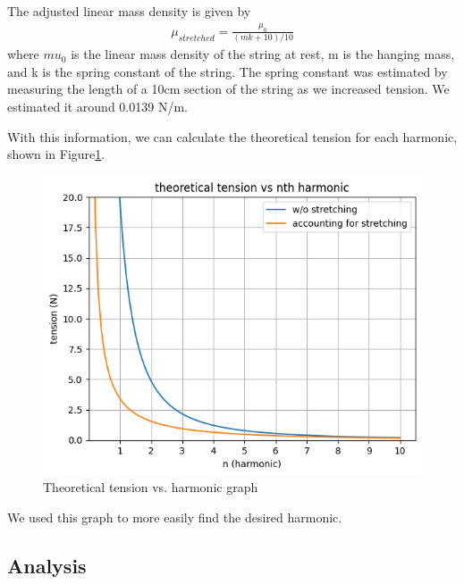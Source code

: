 \documentclass[11pt]{article}
\begin{document}
    The adjusted linear mass density is given by
    \begin{align*}
        \mu_{stretched} = \frac{\mu_0}{(mk+10)/10}
    \end{align*}
    where $mu_0$ is the linear mass density of the string at rest, m is the hanging mass, and k is the spring constant of the string.
    The spring constant was estimated by measuring the length of a 10cm section of the string as we increased tension.
    We estimated it around 0.0139 N/m.

    With this information, we can calculate the theoretical tension for each harmonic, shown in Figure\ref{fig:theoretical_tension}.

    \begin{figure}[H]
        \includegraphics[width=1\textwidth]{resources/images/p2 theoretical tension graph}
        \caption{Theoretical tension vs. harmonic graph}
        \label{fig:theoretical_tension}
    \end{figure}

    We used this graph to more easily find the desired harmonic.

    \subsection{Analysis}\label{subsec:part_2_analysis}
\end{document}
